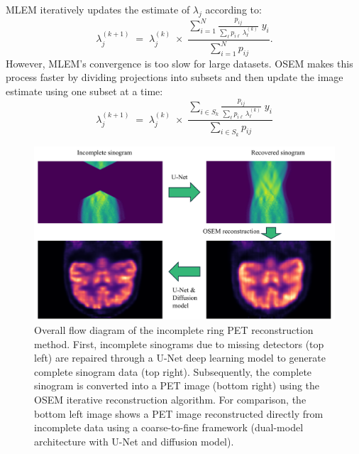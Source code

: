 \documentclass[
reprint,
superscriptaddress,
nofootinbib,
amsmath,amssymb,
aps,
prd,
]{revtex4-2}
\begin{document}
MLEM iteratively updates the estimate of $\lambda_j$ according to:
\begin{equation}
    \lambda_j^{(k+1)}
    \;=\;
    \lambda_j^{(k)}
    \;\times\;
    \frac{\displaystyle \sum_{i=1}^{N} \frac{p_{ij}}{\sum_{\ell} p_{i\ell}\,\lambda_{\ell}^{(k)}} \; y_i}
    {\displaystyle \sum_{i=1}^{N} p_{ij}}.
\end{equation}
However, MLEM's convergence is too slow for large datasets. OSEM makes this process faster by dividing projections into subsets and then update the image estimate using one subset at a time:
\begin{equation}
    \lambda_j^{(k+1)}
\;=\;
\lambda_j^{(k)}
\;\times\;
\frac{\displaystyle \sum_{i \in S_{k}} \frac{p_{ij}}{\sum_{\ell} p_{i\ell}\,\lambda_{\ell}^{(k)}} \; y_i}
{\displaystyle \sum_{i \in S_{k}} p_{ij}}
\end{equation}
\begin{figure}[ht]
    \centering
    \includegraphics[width=\textwidth]{Images/reconstruction_workflow}
    \vspace{-.5cm}
    \caption{Overall flow diagram of the incomplete ring PET reconstruction method. First, incomplete sinograms due to missing detectors (top left) are repaired through a U-Net deep learning model to generate complete sinogram data (top right). Subsequently, the complete sinogram is converted into a PET image (bottom right) using the OSEM iterative reconstruction algorithm. For comparison, the bottom left image shows a PET image reconstructed directly from incomplete data using a coarse-to-fine framework (dual-model architecture with U-Net and diffusion model). 
    }
    \vspace{-.2cm}
    \label{fig:reconstruction_workflow}
\end{figure}
\end{document}

